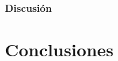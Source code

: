 \documentclass[a4paper,12pt,fleqn,twoside,openany]{book}
\begin{document}
 
 \subsection{Discusión}
 
 


 






\chapter{Conclusiones}
\end{document}
